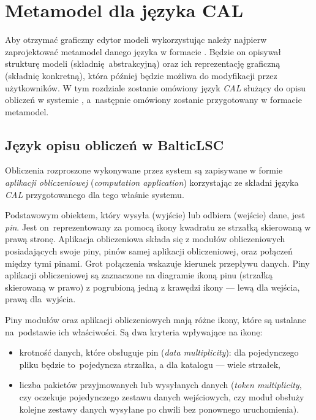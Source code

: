 \chapter{Metamodel dla języka CAL}\label{chapter:cal-metamodel}

Aby otrzymać graficzny edytor modeli wykorzystując \SiriusWeb{} należy
najpierw zaprojektować metamodel danego języka w formacie \Ecore{}. Będzie on
opisywał strukturę modeli (składnię abstrakcyjną) oraz ich
reprezentację graficzną (składnię konkretną), która później będzie możliwa do
modyfikacji przez użytkowników. W tym rozdziale
zostanie omówiony język \emph{\acrfull{CAL}} służący do opisu obliczeń w
systemie \BalticLSC{}, a~następnie omówiony zostanie przygotowany w formacie
\Ecore{} metamodel.

\section{Język opisu obliczeń w BalticLSC}

Obliczenia rozproszone wykonywane przez system \BalticLSC{} są zapisywane w
formie \emph{aplikacji obliczeniowej}
(\emph{computation application})
korzystając ze składni języka \emph{\acrfull{CAL}} przygotowanego dla tego
właśnie systemu.

Podstawowym obiektem, który wysyła (wyjście)
lub odbiera (wejście) dane, jest \emph{pin}. Jest on~reprezentowany za pomocą
ikony kwadratu ze strzałką skierowaną w prawą stronę. Aplikacja obliczeniowa
składa
się z modułów obliczeniowych posiadających swoje piny, pinów samej aplikacji
obliczeniowej, oraz połączeń między tymi pinami. Grot połączenia wskazuje
kierunek przepływu danych.
Piny aplikacji obliczeniowej są zaznaczone na
diagramie ikoną pinu (strzałką skierowaną w prawo) z pogrubioną
jedną z krawędzi ikony --- lewą dla wejścia, prawą dla~wyjścia.

Piny modułów oraz aplikacji obliczeniowych mają różne ikony, które
są ustalane na~podstawie ich właściwości. Są dwa kryteria wpływające na ikonę:

\begin{itemize}
	\item krotność danych, które obsługuje pin (\emph{data
		      multiplicity}):  dla pojedynczego pliku będzie to~pojedyncza strzałka, a dla katalogu --- wiele strzałek,
	\item liczba pakietów przyjmowanych lub wysyłanych danych (\emph{token
		      multiplicity}, czy oczekuje pojedynczego zestawu danych wejściowych, czy moduł obsłuży kolejne zestawy danych wysyłane po chwili bez ponownego uruchomienia).
\end{itemize}

